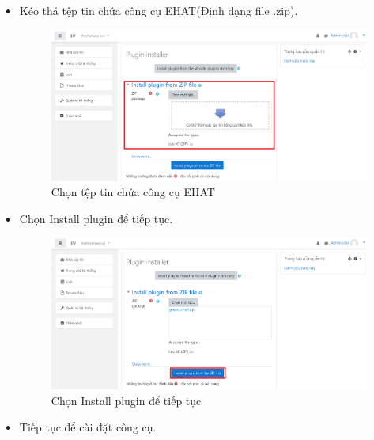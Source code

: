 \begin{itemize}
	\newpage
	\item Kéo thả tệp tin chứa công cụ EHAT(Định dạng file .zip).
	
	\begin{center}
		\begin{figure}[htp]
			\begin{center}
				\includegraphics[width=1\linewidth]{img/8}
			\end{center}
			\caption{Chọn tệp tin chứa công cụ EHAT}
			\label{refhinh38}
		\end{figure}
	\end{center}
	
	\item Chọn Install plugin để tiếp tục.
	
	\begin{center}
		\begin{figure}[htp]
			\begin{center}
				\includegraphics[width=1\linewidth]{img/9}
			\end{center}
			\caption{Chọn Install plugin để tiếp tục}
			\label{refhinh39}
		\end{figure}
	\end{center}
	
	\newpage
	\item Tiếp tục để cài đặt công cụ.
	

\end{itemize}
